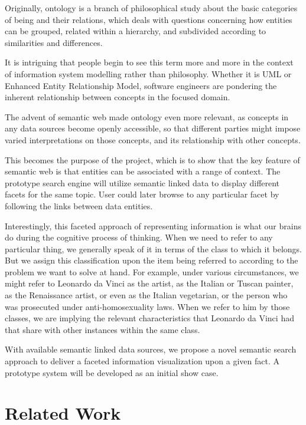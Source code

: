 \documentclass[12pt]{cls}
\begin{document}
Originally, ontology is a branch of philosophical study about the basic categories of being and their relations, which deals with questions concerning how entities can be grouped, related within a hierarchy, and subdivided according to similarities and differences.

It is intriguing that people begin to see this term more and more in the context of information system modelling rather than philosophy. Whether it is UML or Enhanced Entity Relationship Model, software engineers are pondering the inherent relationship between concepts in the focused domain.

The advent of semantic web made ontology even more relevant, as concepts in any data sources become openly accessible, so that different parties might impose varied interpretations on those concepts, and its relationship with other concepts.

This becomes the purpose of the project, which is to show that the key feature of semantic web is that entities can be associated with a range of context. The prototype search engine will utilize semantic linked data to display different facets for the same topic. User could later browse to any particular facet by following the links between data entities.

Interestingly, this faceted approach of representing information is what our brains do during the cognitive process of thinking. When we need to refer to any particular thing, we generally speak of it in terms of the class to which it belongs. But we assign this classification upon the item being referred to according to the problem we want to solve at hand. For example, under various circumstances, we might refer to Leonardo da Vinci as the artist, as the Italian or Tuscan painter, as the Renaissance artist, or even as the Italian vegetarian, or the person who was prosecuted under anti-homosexuality laws. When we refer to him by those classes, we are implying the relevant characteristics that Leonardo da Vinci had that share with other instances within the same class.

With available semantic linked data sources, we propose a novel semantic search approach to deliver a faceted information visualization upon a given fact. A prototype system will be developed as an initial show case.

\section{Related Work}
\end{document}
